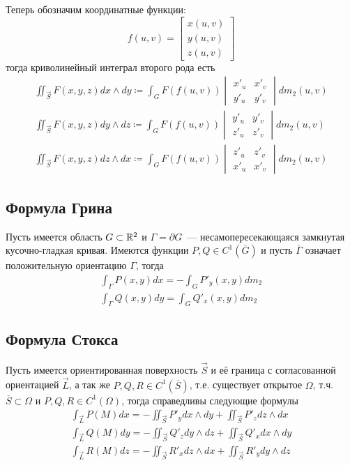 \documentclass[main]{subfiles}
\begin{document}
Теперь обозначим координатные функции:
\[f(u, v) = \begin{bmatrix}
        x(u, v) \\
        y(u, v) \\
        z(u, v)
    \end{bmatrix}\]
тогда криволинейный интеграл второго рода есть
\begin{gather*}
    \iint_{\overrightarrow{S}} F(x, y, z) dx \wedge dy \coloneq \int_G F(f(u, v)) \begin{vmatrix}
        x'_u & x'_v \\
        y'_u & y'_v
    \end{vmatrix} dm_2(u, v) \\
    \iint_{\overrightarrow{S}} F(x, y, z) dy \wedge dz \coloneq \int_G F(f(u, v)) \begin{vmatrix}
        y'_u & y'_v \\
        z'_u & z'_v
    \end{vmatrix} dm_2(u, v) \\
    \iint_{\overrightarrow{S}} F(x, y, z) dz \wedge dx \coloneq \int_G F(f(u, v)) \begin{vmatrix}
        z'_u & z'_v \\
        x'_u & x'_v
    \end{vmatrix} dm_2(u, v)
\end{gather*}

\subsection{Формула Грина}
Пусть имеется область $G \subset \mathbb{R}^2$ и $\Gamma = \partial G$~--- несамопересекающаяся замкнутая кусочно-гладкая кривая.
Имеются функции $P, Q \in C^1(\overline{G})$ и пусть $\overline{\Gamma}$ означает положительную ориентацию $\Gamma$, тогда
\begin{gather*}
    \int_{\Gamma} P(x, y)dx = - \int_G P'_y (x,y) dm_2 \\
    \int_{\Gamma} Q(x, y)dy = \int_G Q'_x (x,y) dm_2
\end{gather*}

\subsection{Формула Стокса}
Пусть имеется ориентированная поверхность $\overrightarrow{S}$ и её граница с согласованной ориентацией $\overrightarrow{L}$, а так же $P, Q, R \in C^1 (\overline{S})$, т.е. существует открытое $\Omega$, т.ч. $\overline{S} \subset \Omega$ и $P, Q, R \in C^1(\Omega)$, тогда справедливы следующие формулы
\begin{gather*}
    \int_{\overrightarrow{L}} P(M) dx = - \iint_{\overrightarrow{S}} P'_y dx \wedge dy + \iint_{\overrightarrow{S}} P'_z dz \wedge dx \\
    \int_{\overrightarrow{L}} Q(M) dy = - \iint_{\overrightarrow{S}} Q'_z dy \wedge dz + \iint_{\overrightarrow{S}} Q'_x dx \wedge dy \\
    \int_{\overrightarrow{L}} R(M) dz = - \iint_{\overrightarrow{S}} R'_x dz \wedge dx + \iint_{\overrightarrow{S}} R'_y dy \wedge dz
\end{gather*}
\end{document}
